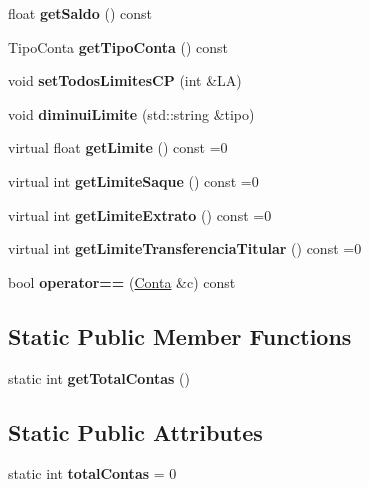 \begin{DoxyCompactItemize}
\mbox{\label{classConta_ade48c55499f84c6c1b261e0c164745e8}} 
float {\bfseries get\+Saldo} () const
\item 
\mbox{\label{classConta_af2f3d065674824fe8a83c6eccfc99708}} 
Tipo\+Conta {\bfseries get\+Tipo\+Conta} () const
\item 
\mbox{\label{classConta_a0f9001a717e7f71230a388e726736946}} 
void {\bfseries set\+Todos\+Limites\+CP} (int \&LA)
\item 
\mbox{\label{classConta_ad48404065aa4c6328bb911e36ddd6a11}} 
void {\bfseries diminui\+Limite} (std\+::string \&tipo)
\item 
\mbox{\label{classConta_a3775ce16c33f3ddcb028029c58670231}} 
virtual float {\bfseries get\+Limite} () const =0
\item 
\mbox{\label{classConta_a2bfc21ffd79608809d4f1cc3548619b4}} 
virtual int {\bfseries get\+Limite\+Saque} () const =0
\item 
\mbox{\label{classConta_ae01ea7c06a5e7ffaee8a869a8a358044}} 
virtual int {\bfseries get\+Limite\+Extrato} () const =0
\item 
\mbox{\label{classConta_afb2847a62f226546b8f21087ef2e5e11}} 
virtual int {\bfseries get\+Limite\+Transferencia\+Titular} () const =0
\item 
\mbox{\label{classConta_a9e465ff288631a7652321d35a197e3e5}} 
bool {\bfseries operator==} (\hyperlink{classConta}{Conta} \&c) const
\end{DoxyCompactItemize}
\subsection*{Static Public Member Functions}
\begin{DoxyCompactItemize}
\item 
\mbox{\label{classConta_abf3c5cda8fa7689e60a2e803e20f1b9c}} 
static int {\bfseries get\+Total\+Contas} ()
\end{DoxyCompactItemize}
\subsection*{Static Public Attributes}
\begin{DoxyCompactItemize}
\item 
\mbox{\label{classConta_aebf38c8207570f4e4a01661e2850c2c5}} 
static int {\bfseries total\+Contas} = 0
\end{DoxyCompactItemize}
